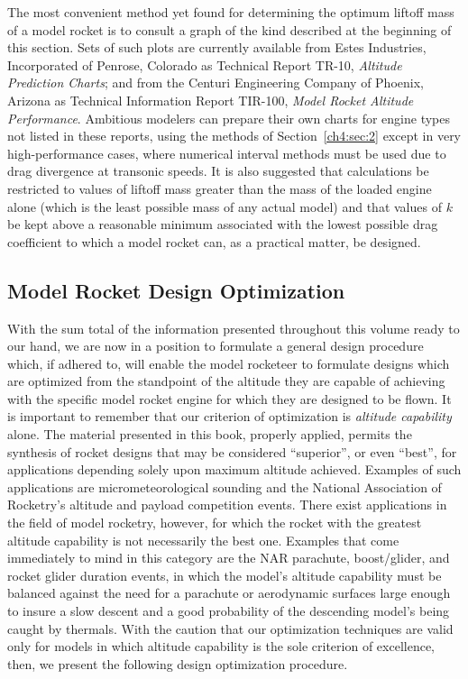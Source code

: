 The most convenient method yet found for determining the optimum liftoff mass of a model rocket is
to consult a graph of the kind described at the beginning of this section. Sets of such plots are
currently available from Estes Industries, Incorporated of Penrose, Colorado as Technical Report
TR-10, \emph{Altitude Prediction Charts}; and from the Centuri Engineering Company of Phoenix,
Arizona as Technical Information Report TIR-100, \emph{Model Rocket Altitude Performance}.
Ambitious modelers can prepare their own charts for engine types not listed in these reports,
using the methods of Section~\ref{ch4:sec:2} except in very high-performance cases, where numerical
interval methods must be used due to drag divergence at transonic speeds. It is also suggested
that calculations be restricted to values of liftoff mass greater than the mass of the loaded
engine alone (which is the least possible mass of any actual model) and that values of $k$ be kept
above a reasonable minimum associated with the lowest possible drag coefficient to which a model
rocket can, as a practical matter, be designed.

\subsection{Model Rocket Design Optimization}\label{ch4:sec:5.2}

With the sum total of the information presented throughout this volume ready to our hand, we are
now in a position to formulate a general design procedure which, if adhered to, will enable the
model rocketeer to formulate designs which are optimized from the standpoint of the altitude they
are capable of achieving with the specific model rocket engine for which they are designed to be
flown. It is important to remember that our criterion of optimization is \emph{altitude
capability} alone. The material presented in this book, properly applied, permits the synthesis of
rocket designs that may be considered ``superior'', or even ``best'', for applications depending
solely upon maximum altitude achieved. Examples of such applications are micrometeorological
sounding and the National Association of Rocketry's altitude and payload competition events. There
exist applications in the field of model rocketry, however, for which the rocket with the greatest
altitude capability is not necessarily the best one. Examples that come immediately to mind in this
category are the NAR parachute, boost/glider, and rocket glider duration events, in which the
model's altitude capability must be balanced against the need for a parachute or aerodynamic
surfaces large enough to insure a slow descent and a good probability of the descending model's
being caught by thermals. With the caution that our optimization techniques are valid only for
models in which altitude capability is the sole criterion of excellence, then, we present the
following design optimization procedure.

